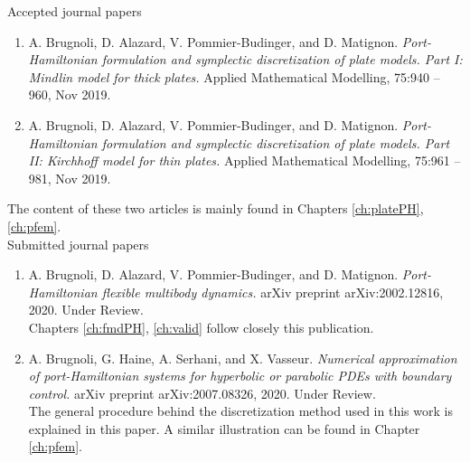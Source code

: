 Accepted journal papers \cite{brugnoli2019ammmin,brugnoli2019ammkir}
\begin{enumerate}
\item A. Brugnoli, D. Alazard, V. Pommier-Budinger, and D. Matignon. \textit{Port-Hamiltonian formulation and symplectic discretization of plate models. Part I: Mindlin model for thick plates.} Applied Mathematical Modelling, 75:940 – 960, Nov 2019. 
\item A. Brugnoli, D. Alazard, V. Pommier-Budinger, and D. Matignon. \textit{Port-Hamiltonian formulation and symplectic discretization of plate models. Part II: Kirchhoff model for thin plates.} Applied Mathematical Modelling, 75:961 – 981, Nov 2019. 
\end{enumerate}
The content of these two articles is mainly found in Chapters \ref{ch:platePH}, \ref{ch:pfem}. \\

Submitted journal papers \cite{brugnoli2020msd,brugnoli2020numerical}
\begin{enumerate}
\item A. Brugnoli, D. Alazard, V. Pommier-Budinger, and D. Matignon. \textit{Port-Hamiltonian flexible multibody dynamics.} arXiv preprint arXiv:2002.12816, 2020. Under Review. \\
Chapters \ref{ch:fmdPH}, \ref{ch:valid} follow closely this publication.
\item A. Brugnoli, G. Haine, A. Serhani, and X. Vasseur. \textit{Numerical approximation of port-Hamiltonian systems for hyperbolic or parabolic PDEs with boundary control.} arXiv preprint arXiv:2007.08326, 2020. Under Review. \\
The general procedure behind the discretization method used in this work is explained in this paper. A similar illustration can be found in Chapter \ref{ch:pfem}.
\end{enumerate}

